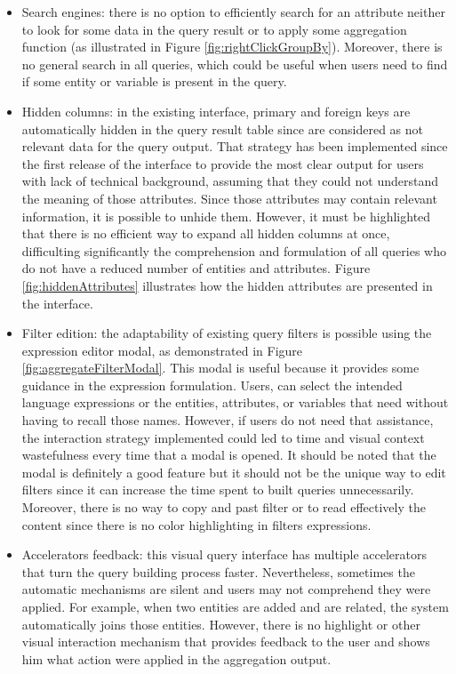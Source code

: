 \begin{itemize}
    \item Search engines: there is no option to efficiently search for an attribute neither to look for some data in the query result or to apply some aggregation function (as illustrated in Figure \ref{fig:rightClickGroupBy}). Moreover, there is no general search in all queries, which could be useful when users need to find if some entity or variable is present in the query.
    \item Hidden columns: in the existing interface, primary and foreign keys are automatically hidden in the query result table since are considered as not relevant data for the query output. That strategy has been implemented since the first release of the interface to provide the most clear output for users with lack of technical background, assuming that they could not understand the meaning of those attributes. Since those attributes may contain relevant information, it is possible to unhide them. However, it must be highlighted that there is no efficient way to expand all hidden columns at once, difficulting significantly the comprehension and formulation of all queries who do not have a reduced number of entities and attributes. Figure \ref{fig:hiddenAttributes} illustrates how the hidden attributes are presented in the interface.
    \item Filter edition: the adaptability of existing query filters is possible using the expression editor modal, as demonstrated in Figure \ref{fig:aggregateFilterModal}. This modal is useful because it provides some guidance in the expression formulation. Users, can select the intended language expressions or the entities, attributes, or variables that need without having to recall those names. However, if users do not need that assistance, the interaction strategy implemented could led to time and visual context wastefulness every time that a modal is opened. It should be noted that the modal is definitely a good feature but it should not be the unique way to edit filters since it can increase the time spent to built queries unnecessarily. Moreover, there is no way to copy and past filter or to read effectively the content since there is no color highlighting in filters expressions.
    \item Accelerators feedback: this visual query interface has multiple accelerators that turn the query building process faster. Nevertheless, sometimes the automatic mechanisms are silent and users may not comprehend they were applied. For example, when two entities are added and are related, the system automatically joins those entities. However, there is no highlight or other visual interaction mechanism that provides feedback to the user and shows him what action were applied in the aggregation output.

\end{itemize}
